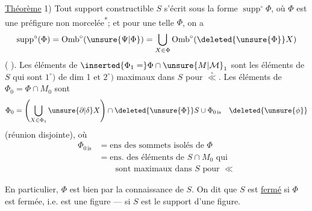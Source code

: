 \uline{Théorème} 1) Tout support constructible $S$ s'écrit sous la forme $\operatorname{supp}^{\circ}\Phi$, où $\Phi$ est une préfigure non morcelée\textsuperscript{*};
et pour une telle $\Phi$, on a
\[
\operatorname{supp}^{\circ}(\Phi)=\operatorname{Omb}^{\circ}(\unsure{\Psi|\Phi})=\bigcup_{X\in\Phi}\operatorname{Omb}^{\circ}(\deleted{\unsure{\Phi}}X)
\]
( ).
Les éléments de $\inserted{\Phi_1=}\Phi\cap\unsure{M|\mathcal{M}}_1$ sont les éléments de $S$ qui sont  $1^{\circ})$ de dim 1 et $2^{\circ})$ maximaux dans $S$ pour $\overset{\circ}{\ll}$.  Les éléments de $\Phi_0=\Phi\cap M_0$ sont  
\[
\Phi_0=\left(\bigcup_{X\in\Phi_1}\unsure{\partial|\delta}X\right)\cap\deleted{\unsure{\Phi}}S\cup\Phi_{0\,\mathrm{is}}\quad\deleted{\unsure{\phi}}
\]
(réunion disjointe), où 
\[
\begin{aligned}
\Phi_{0\,\mathrm{is}}&=\text{ens des sommets isolés de }\Phi\\
&=\text{ens. des éléments de }S\cap M_0\text{ qui}\\
&\qquad\text{sont maximaux dans }S\text{ pour }\ll
\end{aligned}
\]

 En particulier, $\Phi$ est bien  par la connaissance de $S$. On dit que $S$ est \uline{fermé} si $\Phi$ est fermée, i.e. est une figure ---  si $S$ est le support d'une figure.

